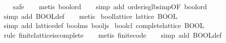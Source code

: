 \begin{isabellebody}
\ \ \isamarkupfalse%
\ safe\isanewline
\ \ \isamarkupfalse%
\ {}metis\ bool{}ord{}\isanewline
\ \ \isamarkupfalse%
\ {}simp\ add{}\ order{}is{}glb{}simp{}OF\ bool{}ord{}{}\isanewline
\ \ \isamarkupfalse%
\ {}simp\ add{}\ BOOL{}def{}\isanewline
\ \ \isamarkupfalse%
\ metis%
\endisatagproof
{\isafoldproof}%
%
\isadelimproof
\isanewline
%
\endisadelimproof
\isanewline
{}\isamarkupfalse%
\ bool{}lattice{}\ {}lattice\ BOOL{}\isanewline
%
\isadelimproof
\ \ %
\endisadelimproof
%
\isatagproof
{}\isamarkupfalse%
\ {}simp\ add{}\ lattice{}def\ bool{}ms\ bool{}js{}%
\endisatagproof
{\isafoldproof}%
%
\isadelimproof
\isanewline
%
\endisadelimproof
\isanewline
{}\isamarkupfalse%
\ bool{}cl{}\ {}complete{}lattice\ BOOL{}\isanewline
%
\isadelimproof
\ \ %
\endisadelimproof
%
\isatagproof
{}\isamarkupfalse%
\ {}rule\ finite{}lattice{}is{}complete{}\isanewline
\ \ \isamarkupfalse%
\ {}metis\ finite{}code{}\isanewline
\ \ \isamarkupfalse%
\ {}simp\ add{}\ BOOL{}def{}\isanewline

\end{isabellebody}
